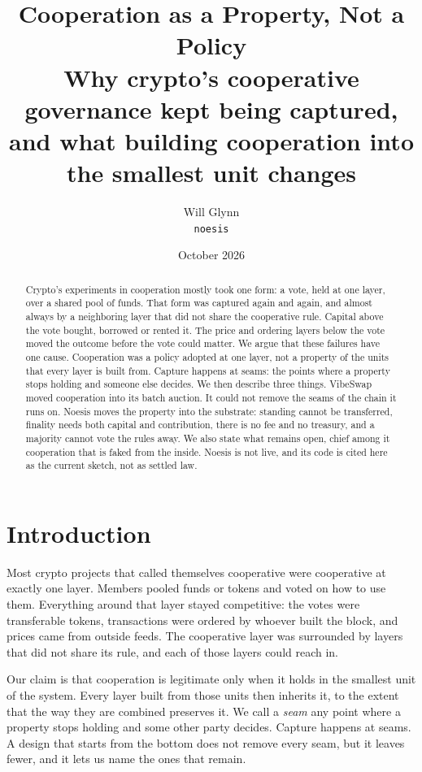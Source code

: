 \documentclass[11pt]{article}
\title{Cooperation as a Property, Not a Policy\\[4pt]
\large Why crypto's cooperative governance kept being captured,\\ and what building cooperation into the smallest unit changes}
\author{Will Glynn\\ \texttt{noesis}}
\date{October 2026}
\begin{document}
\maketitle

\begin{abstract}
Crypto's experiments in cooperation mostly took one form: a vote, held at one layer, over a shared pool of funds. That form was captured again and again, and almost always by a neighboring layer that did not share the cooperative rule. Capital above the vote bought, borrowed or rented it. The price and ordering layers below the vote moved the outcome before the vote could matter. We argue that these failures have one cause. Cooperation was a policy adopted at one layer, not a property of the units that every layer is built from. Capture happens at seams: the points where a property stops holding and someone else decides. We then describe three things. VibeSwap moved cooperation into its batch auction. It could not remove the seams of the chain it runs on. Noesis moves the property into the substrate: standing cannot be transferred, finality needs both capital and contribution, there is no fee and no treasury, and a majority cannot vote the rules away. We also state what remains open, chief among it cooperation that is faked from the inside. Noesis is not live, and its code is cited here as the current sketch, not as settled law.
\end{abstract}

\section{Introduction}

Most crypto projects that called themselves cooperative were cooperative at exactly one layer. Members pooled funds or tokens and voted on how to use them. Everything around that layer stayed competitive: the votes were transferable tokens, transactions were ordered by whoever built the block, and prices came from outside feeds. The cooperative layer was surrounded by layers that did not share its rule, and each of those layers could reach in.

Our claim is that cooperation is legitimate only when it holds in the smallest unit of the system. Every layer built from those units then inherits it, to the extent that the way they are combined preserves it. We call a \emph{seam} any point where a property stops holding and some other party decides. Capture happens at seams. A design that starts from the bottom does not remove every seam, but it leaves fewer, and it lets us name the ones that remain.
\end{document}
